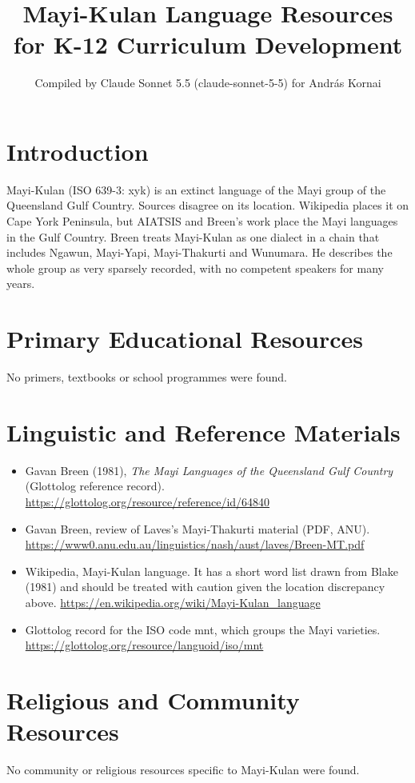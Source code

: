 \documentclass[12pt]{article}
\title{Mayi-Kulan Language Resources for K-12 Curriculum Development}
\author{Compiled by Claude Sonnet 5.5 (claude-sonnet-5-5) for Andr\'as Kornai}
\date{}
\begin{document}
\maketitle

\section{Introduction}
Mayi-Kulan (ISO 639-3: xyk) is an extinct language of the Mayi group of the Queensland Gulf Country. Sources disagree on its location. Wikipedia places it on Cape York Peninsula, but AIATSIS and Breen's work place the Mayi languages in the Gulf Country. Breen treats Mayi-Kulan as one dialect in a chain that includes Ngawun, Mayi-Yapi, Mayi-Thakurti and Wunumara. He describes the whole group as very sparsely recorded, with no competent speakers for many years.

\section{Primary Educational Resources}
No primers, textbooks or school programmes were found.

\section{Linguistic and Reference Materials}
\begin{itemize}
\item Gavan Breen (1981), \emph{The Mayi Languages of the Queensland Gulf Country} (Glottolog reference record). \url{https://glottolog.org/resource/reference/id/64840}
\item Gavan Breen, review of Laves's Mayi-Thakurti material (PDF, ANU). \url{https://www0.anu.edu.au/linguistics/nash/aust/laves/Breen-MT.pdf}
\item Wikipedia, Mayi-Kulan language. It has a short word list drawn from Blake (1981) and should be treated with caution given the location discrepancy above. \url{https://en.wikipedia.org/wiki/Mayi-Kulan_language}
\item Glottolog record for the ISO code mnt, which groups the Mayi varieties. \url{https://glottolog.org/resource/languoid/iso/mnt}
\end{itemize}

\section{Religious and Community Resources}
No community or religious resources specific to Mayi-Kulan were found.
\end{document}
